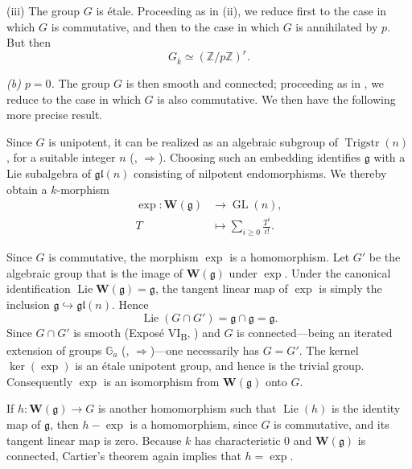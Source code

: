 
\smallskip
\noindent(iii) The group \(G\) is étale.  Proceeding as in (ii), we reduce first to
the case in which \(G\) is commutative, and then to the case in which
\(G\) is annihilated by \(p\).  But then
\[
  G_{\overline{k}}\simeq(\mathbb Z/p\mathbb Z)^r.
\]

\smallskip
\noindent\textit{(b) \(p=0\).}\quad
The group \(G\) is then smooth and connected; proceeding as in
, we reduce to the case in which \(G\) is also commutative.
We then have the following more precise result.


Since \(G\) is unipotent, it can be realized as an algebraic
subgroup of \(\operatorname{Trigstr}(n)\), for a suitable integer
\(n\) (, \(\Rightarrow\)).  Choosing such an embedding
identifies \(\mathfrak g\) with a Lie subalgebra of
\(\mathfrak{gl}(n)\) consisting of nilpotent endomorphisms.  We
thereby obtain a \(k\)-morphism
\[
  \begin{aligned}
  \exp:\mathbf W(\mathfrak g)&\longrightarrow
    \operatorname{GL}(n),\\
  T&\longmapsto\sum_{i\geq0}\frac{T^i}{i!}.
  \end{aligned}
\]

Since \(G\) is commutative, the morphism \(\exp\) is a
homomorphism.  Let \(G'\) be the algebraic group that is the image
of \(\mathbf W(\mathfrak g)\) under \(\exp\).  Under the canonical
identification
\(\operatorname{Lie}\mathbf W(\mathfrak g)=\mathfrak g\), the
tangent linear map of \(\exp\) is simply the inclusion
\(\mathfrak g\hookrightarrow\mathfrak{gl}(n)\).  Hence
\[
  \operatorname{Lie}(G\cap G')
  =\mathfrak g\cap\mathfrak g=\mathfrak g.
\]
Since \(G\cap G'\) is smooth (Exposé VI\textsubscript{B}, )
and \(G\) is connected---being an iterated extension of groups
\(\mathbb G_a\) (, \(\Rightarrow\))---one necessarily has
\(G=G'\).  The kernel \(\ker(\exp)\) is an étale unipotent group,
and hence is the trivial group.  Consequently \(\exp\) is an
isomorphism from \(\mathbf W(\mathfrak g)\) onto \(G\).

If \(h:\mathbf W(\mathfrak g)\to G\) is another homomorphism such
that \(\operatorname{Lie}(h)\) is the identity map of
\(\mathfrak g\), then \(h-\exp\) is a homomorphism, since \(G\) is
commutative, and its tangent linear map is zero.  Because \(k\) has
characteristic \(0\) and \(\mathbf W(\mathfrak g)\) is connected,
Cartier's theorem again implies that \(h=\exp\).
